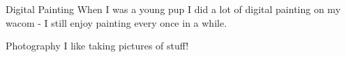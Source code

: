 \begin{section}
  \entry%
    {}
    {}
    {\faPaintBrush{}\hspace{.5em} Digital Painting}
    {}
    {%
      When I was a young pup I did a lot of digital painting on my wacom - I still enjoy painting every once in a while.
    }

  \entry%
    {} 
    {} 
    {\faCamera{}\hspace{.5em} Photography}
    {} 
    {%
      I like taking pictures of stuff!
    }
\end{section}
